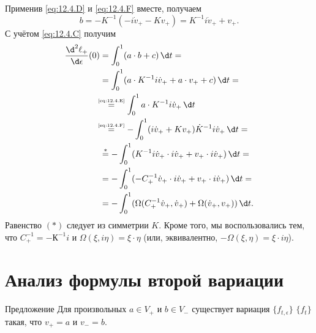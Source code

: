 Применив \ref{eq:12.4.D} и \ref{eq:12.4.F} вместе, получаем
\[b=-K^{-1}(-i\dot v_+ - K v_+) = K^{-1}i\dot v_+ + v_+.\]
С учётом \ref{eq:12.4.C} получим
\begin{align*}
\frac{\d^2\ell_+}{\d\epsilon}(0)
&=
\int_0^1(a\cdot b+c)\,\d t=
\\
&=\int_0^1(a\cdot K^{-1}i\dot v_++a\cdot v_++c)\,\d t=
\\
&\!\!\!\stackrel{\text{\tiny \ref{eq:12.4.E}}}{=}\int_0^1 a\cdot K^{-1}i\dot v_+\,\d t
\\
&\!\!\!\stackrel{\text{\tiny \ref{eq:12.4.F}}}{=}-\int_0^1(i\dot v_++Kv_+)\dot K^{-1}i\dot v_+\,\d t=
\\
&\stackrel{{*}}{=}-\int_0^1(K^{-1}i\dot v_+\cdot i\dot v_+ +v_+\cdot i\dot v_+)\,\d t=
\\
&=-\int_0^1(-C_+^{-1}\dot v_+\cdot i\dot v_++v_+\cdot i\dot v_+)\,\d t=
\\
&=-\int_0^1(\Omega(C_+^{-1}\dot v_+,\dot v_+)+\Omega(\dot v_+,v_+))\,\d t.
\end{align*}
Равенство $({*})$ следует из симметрии $K$.
Кроме того, мы воспользовались тем, что $C_+^{-1} = -К^{-1} i$ и $\Omega(\xi, i\eta) = \xi\cdot \eta$
(или, эквивалентно, $-\Omega(\xi, \eta) = \xi\cdot i\eta$).

\section{Анализ формулы второй вариации}\label{sec:12.5}

\begin{thm}{Предложение}\label{12.5.A}
Для произвольных $a \in V_+$ и $b \in V_-$ существует вариация $\{f_{t,\epsilon}\}$  $\{f_t\}$ такая, что $v_+ = a$ и $v_- = b$.
\end{thm}

